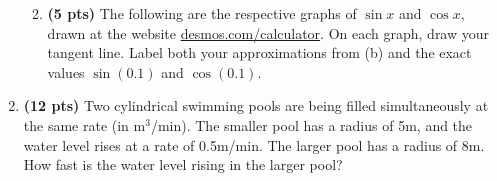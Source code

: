 \documentclass[12pt]{article}
\begin{document}
\begin{enumerate}[1.]
\begin{enumerate}
	\vspace{6pc}
	\item {\bf(5 pts)} The following are the respective graphs of $\sin x$ and $\cos x$, drawn at the website \url{desmos.com/calculator}.  On each graph, draw your tangent line.  Label both your approximations from (b) and the exact values $\sin{(0.1)}$ and $\cos{(0.1)}$.  
	
	\vspace{2pc}
		
	\vspace{2pc}
	\end{enumerate}

\vspace{1pc}
\item %
{\bf(12 pts)} Two cylindrical swimming pools are being filled simultaneously at the same rate (in m$^{\text{3}}$/min).  The smaller pool has a radius of 5m, and the water level rises at a rate of 0.5m/min.  The larger pool has a radius of 8m.  How fast is the water level rising in the larger pool?


\end{enumerate}
\end{document}
